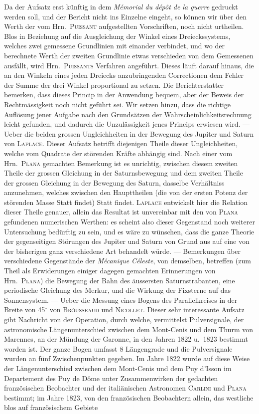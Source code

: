\documentclass[12pt,a4paper]{article}
\begin{document}
Da der Aufsatz erst k\"unftig in dem \textit{M\'emorial du d\'ep\^ot de la guerre} gedruckt werden soll, und der Bericht nicht ins Einzelne eingeht, so k\"onnen wir \"uber den Werth der vom Hrn.\ \textsc{Puissant} aufgestellten Vorschriften, noch nicht urtheilen. Blos in Beziehung auf die Ausgleichung der Winkel eines Dreieckssystems, welches zwei gemessene Grundlinien mit einander verbindet, und wo der berechnete Werth der zweiten Grundlinie etwas verschieden von dem Gemessenen ausf\"allt, wird Hrn.\ \textsc{P\"uissants} Verfahren angef\"uhrt. Dieses l\"auft darauf hinaus, die an den Winkeln eines jeden Dreiecks anzubringenden Correctionen dem Fehler der Summe der drei Winkel proportional zu setzen. Die Berichterstatter bemerken, dass dieses Princip in der Anwendung bequem, aber der Beweis der Rechtm\"assigkeit noch nicht gef\"uhrt sei. Wir setzen hinzu, dass die richtige Aufl\"osung jener Aufgabe nach den Grunds\"atzen der Wahrscheinlichkeitsrechnung leicht gefunden, und dadurch die Unzul\"assigkeit jenes Princips erwiesen wird. --- Ueber die beiden grossen Ungleichheiten in der Bewegung des Jupiter und Saturn von \textsc{Laplace}. Dieser Aufsatz betrifft diejenigen Theile dieser Ungleichheiten, welche vom Quadrate der st\"orenden Kr\"afte abh\"angig sind. Nach einer vom Hrn.\ \textsc{Plana} gemachten Bemerkung ist es unrichtig, zwischen diesem zweiten Theile der grossen Gleichung in der Saturnsbewegung und dem zweiten Theile der grossen Gleichung in der Bewegung des Saturn, dasselbe Verh\"altniss anzunehmen, welches zwischen den Haupttheilen (die von der ersten Potenz der st\"orenden Masse Statt findet) Statt findet. \textsc{Laplace} entwickelt hier die Relation dieser Theile genauer, allein das Resultat ist unvereinbar mit den von \textsc{Plana} gefundenen numerischen Werthen: es scheint also dieser Gegenstand noch weiterer Untersuchung bed\"urftig zu sein, und es w\"are zu w\"unschen, dass die ganze Theorie der gegenseitigen St\"orungen des Jupiter und Saturn von Grund aus auf eine von der bisherigen ganz verschiedene Art behandelt w\"urde. --- Bemerkungen \"uber verschiedene Gegenst\"ande der \textit{M\'ecanique C\'eleste}, von demselben, betreffen (zum Theil als Erwiderungen einiger dagegen gemachten Erinnerungen von Hrn.\ \textsc{Plana}) die Bewegung der Bahn des \"aussersten Saturnstrabanten, eine periodische Gleichung des Merkur, und die Wirkung der Fixsterne auf das Sonnensystem. --- Ueber die Messung eines Bogens des Parallelkreises in der Breite von 45$^{\circ}$ von \textsc{Br\'ousseaud} und \textsc{Nicollet}. Dieser sehr interessante Aufsatz gibt Nachricht von der Operation, durch welche, vermittelst Pulversignale, der astronomische L\"angenunterschied zwischen dem Mont-Cenis und dem Thurm von Marennes, an der M\"undung der Garonne, in den Jahren 1822 u.\ 1823 bestimmt worden ist. Der ganze Bogen umfasst 8 L\"angengrade und die Pulversignale wurden an f\"unf Zwischenpunkten gegeben. Im Jahre 1822 wurde auf diese Weise der L\"angenunterschied zwischen dem Mont-Cenis und dem Puy d'Isson im Departement des Puy de D\^ome unter Zusammenwirken der gedachten franz\"osischen Beobachter und der itali\"anischen Astronomen \textsc{Carlini} und \textsc{Plana} bestimmt; im Jahre 1823, von den franz\"osischen Beobachtern allein, das westliche blos auf franz\"osischem Gebiete 
\end{document}
